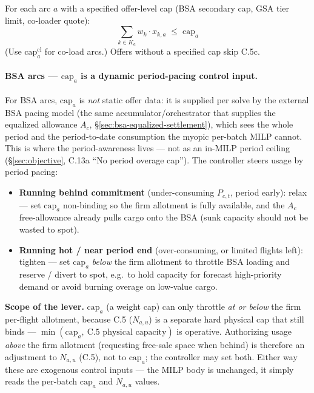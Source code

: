 \documentclass[11pt,a4paper]{article}
\theoremstyle{definition}
\begin{document}
For each arc $a$ with a specified offer-level cap (BSA secondary cap, GSA
tier limit, co-loader quote):
\begin{equation}
  \sum_{k \in K_a} w_k \cdot x_{k,a} \;\leq\; \text{cap}_a
  \label{eq:C5c}
\end{equation}
(Use $\text{cap}_a^{\text{cl}}$ for co-load arcs.) Offers without a specified
cap skip C.5c.

\paragraph{BSA arcs --- $\text{cap}_a$ is a dynamic period-pacing control input.}
For BSA arcs, $\text{cap}_a$ is \emph{not} static offer data: it is supplied
per solve by the external BSA pacing model (the same accumulator/orchestrator
that supplies the equalized allowance $A_c$, \S\ref{sec:bsa-equalized-settlement}),
which sees the whole period and the period-to-date consumption the myopic
per-batch MILP cannot. This is where the period-awareness lives --- not as an
in-MILP period ceiling (\S\ref{sec:objective}, C.13a ``No period overage
cap''). The controller steers usage by period pacing:
\begin{itemize}[noitemsep]
  \item \textbf{Running behind commitment} (under-consuming $P_{c,t}$, period
        early): relax --- set $\text{cap}_a$ non-binding so the firm allotment
        is fully available, and the $A_c$ free-allowance already pulls cargo
        onto the BSA (sunk capacity should not be wasted to spot).
  \item \textbf{Running hot / near period end} (over-consuming, or limited
        flights left): tighten --- set $\text{cap}_a$ \emph{below} the firm
        allotment to throttle BSA loading and reserve / divert to spot,
        e.g.\ to hold capacity for forecast high-priority demand or avoid
        burning overage on low-value cargo.
\end{itemize}
\textbf{Scope of the lever.} $\text{cap}_a$ (a weight cap) can only throttle
\emph{at or below} the firm per-flight allotment, because C.5 ($N_{a,u}$) is a
separate hard physical cap that still binds --- $\min(\text{cap}_a,\ \text{C.5
physical capacity})$ is operative. Authorizing usage \emph{above} the firm
allotment (requesting free-sale space when behind) is therefore an adjustment
to $N_{a,u}$ (C.5), not to $\text{cap}_a$; the controller may set both. Either
way these are exogenous control inputs --- the MILP body is unchanged, it
simply reads the per-batch $\text{cap}_a$ and $N_{a,u}$ values.
\end{document}
